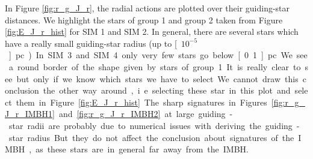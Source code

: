 In Figure \ref{fig:r_g_J_r}, the radial actions are plotted over their guiding-star distances. We highlight the stars of group 1 and group 2 taken from Figure \ref{fig:E_J_r_hist} for SIM 1 and SIM 2. In general, there are several stars which have a really small guiding-star radius (up to  \unit[\(10^{-5}\)]{pc}). In SIM 3 and SIM 4 only very few stars go below \unit[0.1]{pc}. We see a round border of the shape given by stars of group 1. It is really clear to see but only if we know which stars we have to select. We cannot draw this conclusion the other way around, i.e. selecting these star in this plot and select them in Figure \ref{fig:E_J_r_hist}. The sharp signatures in Figures \ref{fig:r_g_J_r_IMBH1} and \ref{fig:r_g_J_r_IMBH2} at large guiding-star radii are probably due to numerical issues with deriving the guiding-star radius. But they do not affect the conclusion about signatures of the \ac{IMBH}, as these stars are in general far away from the \ac{IMBH}.

